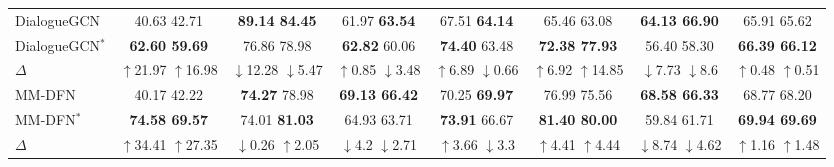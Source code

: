 {{\begin{table*}[!t]
{\begin{tabular}{l|ccccccc}
			
			DialogueGCN   \cite{ghosal2019dialoguegcn}           & 40.63  42.71 & \textbf{89.14  84.45} & 61.97  \textbf{63.54} & 67.51  \textbf{64.14} & 65.46  63.08 & \textbf{64.13  66.90} & 65.91  65.62 \\
			\rowcolor{gray!30}
			DialogueGCN$^\ast$ & \textbf{62.60 59.69} & 76.86 78.98 & \textbf{62.82} 60.06 & \textbf{74.40} 63.48 & \textbf{72.38 77.93} & 56.40 58.30 & \textbf{66.39 66.12}\\ 
			$\Delta$ & \textcolor[rgb]{0.0,0.6,0.0}{$\uparrow$21.97} \textcolor[rgb]{0.0,0.6,0.0}{$\uparrow$16.98}   & \textcolor[rgb]{0.2,0.2,0.2}{$\downarrow$12.28} \textcolor[rgb]{0.2,0.2,0.2}{$\downarrow$5.47}   &  \textcolor[rgb]{0.0,0.6,0.0}{$\uparrow$0.85} \textcolor[rgb]{0.2,0.2,0.2}{$\downarrow$3.48}  &  \textcolor[rgb]{0.0,0.6,0.0}{$\uparrow$6.89} \textcolor[rgb]{0.2,0.2,0.2}{$\downarrow$0.66}  & \textcolor[rgb]{0.0,0.6,0.0}{$\uparrow$6.92} \textcolor[rgb]{0.0,0.6,0.0}{$\uparrow$14.85}  & \textcolor[rgb]{0.2,0.2,0.2}{$\downarrow$7.73} \textcolor[rgb]{0.2,0.2,0.2}{$\downarrow$8.6}  & \textcolor[rgb]{0.0,0.6,0.0}{$\uparrow$0.48} \textcolor[rgb]{0.0,0.6,0.0}{$\uparrow$0.51}  \\  \hline
			
			MM-DFN \cite{hu2022mm}& {40.17 42.22} & \textbf{74.27} 78.98 & \textbf{69.13 66.42} & {70.25} \textbf{69.97} & 76.99 75.56 & \textbf{68.58 66.33} & {68.77 68.20}\\
			\rowcolor{gray!30}
			MM-DFN$^\ast$ & \textbf{74.58 69.57} & 74.01 \textbf{81.03} & 64.93 63.71 & \textbf{73.91} 66.67 & \textbf{81.40 80.00} & 59.84 61.71 & \textbf{69.94 69.69}\\ 
			$\Delta$ &  \textcolor[rgb]{0.0,0.6,0.0}{$\uparrow$34.41} \textcolor[rgb]{0.0,0.6,0.0}{$\uparrow$27.35}  &  \textcolor[rgb]{0.2,0.2,0.2}{$\downarrow$0.26} \textcolor[rgb]{0.0,0.6,0.0}{$\uparrow$2.05}  &  \textcolor[rgb]{0.2,0.2,0.2}{$\downarrow$4.2} \textcolor[rgb]{0.2,0.2,0.2}{$\downarrow$2.71}  &  \textcolor[rgb]{0.0,0.6,0.0}{$\uparrow$3.66} \textcolor[rgb]{0.2,0.2,0.2}{$\downarrow$3.3}  & \textcolor[rgb]{0.0,0.6,0.0}{$\uparrow$4.41} \textcolor[rgb]{0.0,0.6,0.0}{$\uparrow$4.44}  & \textcolor[rgb]{0.2,0.2,0.2}{$\downarrow$8.74} \textcolor[rgb]{0.2,0.2,0.2}{$\downarrow$4.62}  & \textcolor[rgb]{0.0,0.6,0.0}{$\uparrow$1.16} \textcolor[rgb]{0.0,0.6,0.0}{$\uparrow$1.48}  \\  \hline
			

\end{tabular}}
\end{table*}}}
